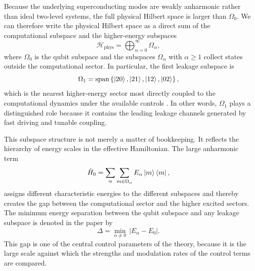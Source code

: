 Because the underlying superconducting modes are weakly anharmonic rather than ideal two-level systems, the full physical Hilbert space is larger than $\Omega_0$. 
We can therefore write the physical Hilbert space as a direct sum of the computational subspace and the higher-energy subspaces
\begin{equation}
\mathcal{H}_{\mathrm{phys}}
=
\bigoplus_{\alpha=0}^{\infty}\Omega_\alpha,
\label{eq:physical_hilbert_direct_sum}
\end{equation}
where $\Omega_0$ is the qubit subspace and the subspaces $\Omega_\alpha$ with $\alpha\geq 1$ collect states outside the computational sector. In particular, the first leakage subspace is
\begin{equation}
\Omega_1
=
\mathrm{span}
\left\{
\ket{20},\ket{21},\ket{12},\ket{02}
\right\},
\label{eq:omega1_first_leakage_subspace}
\end{equation}
which is the nearest higher-energy sector most directly coupled to the computational dynamics under the available controls \cite{Niu2019}. In other words, $\Omega_1$ plays a distinguished role because it contains the leading leakage channels generated by fast driving and tunable coupling.

This subspace structure is not merely a matter of bookkeeping. It reflects the hierarchy of energy scales in the effective Hamiltonian. The large anharmonic term
\begin{equation}
\hat{H}_0
=
\sum_{\alpha}
\sum_{m\in\Omega_\alpha}
E_\alpha \ket{m}\bra{m},
\label{eq:paper_H0_subspace_decomposition}
\end{equation}
assigns different characteristic energies to the different subspaces and thereby creates the gap between the computational sector and the higher excited sectors. The minimum energy separation between the qubit subspace and any leakage subspace is denoted in the paper by
\begin{equation}
\Delta
=
\min_{\alpha\neq 0}\,
|E_\alpha - E_0|.
\label{eq:minimum_subspace_gap}
\end{equation}
This gap is one of the central control parameters of the theory, because it is the large scale against which the strengths and modulation rates of the control terms are compared.


